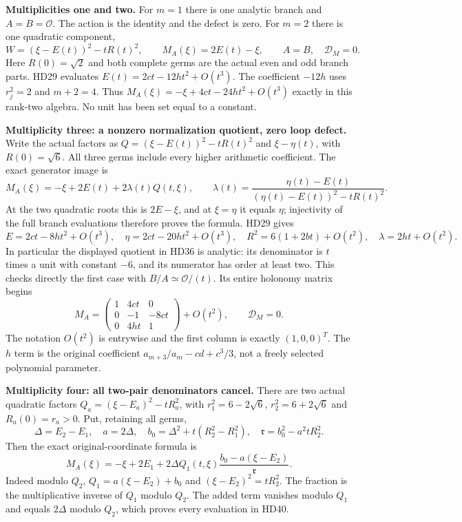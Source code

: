 \HD\textbf{Multiplicities one and two.}
For $m=1$ there is one analytic branch and $A=B=\mathcal O$.
The action is the identity and the defect is zero.
For $m=2$ there is one quadratic component,
\[
 W=(\xi-E(t))^2-tR(t)^2,\qquad
 M_A(\xi)=2E(t)-\xi,\qquad A=B,\quad\mathcal D_M=0 .
 \tag{HD35}
\]
Here $R(0)=\sqrt2$ and both complete germs are the actual
even and odd branch parts. HD29 evaluates
$E(t)=2ct-12ht^2+O(t^3)$.
The coefficient $-12h$ uses $r_j^2=2$ and $m+2=4$.
Thus $M_A(\xi)=-\xi+4ct-24ht^2+O(t^3)$ exactly in this rank-two
algebra. No unit has been set equal to a constant.

\HD\textbf{Multiplicity three: a nonzero normalization quotient, zero loop defect.}
Write the actual factors as
$Q=(\xi-E(t))^2-tR(t)^2$ and $\xi-\eta(t)$, with $R(0)=\sqrt6$.
All three germs include every higher arithmetic coefficient.
The exact generator image is
\[
 M_A(\xi)=-\xi+2E(t)+2\lambda(t)Q(t,\xi),\qquad
 \lambda(t)=\frac{\eta(t)-E(t)}
                {(\eta(t)-E(t))^2-tR(t)^2}.
 \tag{HD36}\label{hd:m3}
\]
At the two quadratic roots this is $2E-\xi$, and at $\xi=\eta$
it equals $\eta$; injectivity of the full branch evaluations
therefore proves the formula. HD29 gives
\[
 E=2ct-8ht^2+O(t^3),\quad
 \eta=2ct-20ht^2+O(t^3),\quad
 R^2=6(1+2bt)+O(t^2),\quad
 \lambda=2ht+O(t^2).
 \tag{HD37}
\]
In particular the displayed quotient in HD36 is analytic: its
denominator is $t$ times a unit with constant $-6$, and its
numerator has order at least two. This checks directly the first
case with $B/A\simeq\mathcal O/(t)$.
Its entire holonomy matrix begins
\[
 M_A=
 \begin{pmatrix}
  1&4ct&0\\
  0&-1&-8ct\\
  0&4ht&1
 \end{pmatrix}
       +O(t^2),\qquad \mathcal D_M=0 .
 \tag{HD38}
\]
The notation $O(t^2)$ is entrywise and the first column is exactly
$(1,0,0)^T$. The $h$ term is the original coefficient
$a_{m+3}/a_m-cd+c^3/3$, not a freely selected polynomial parameter.

\HD\textbf{Multiplicity four: all two-pair denominators cancel.}
There are two actual quadratic factors
$Q_a=(\xi-E_a)^2-tR_a^2$, with
$r_1^2=6-2\sqrt6$, $r_2^2=6+2\sqrt6$ and $R_a(0)=r_a>0$.
Put, retaining all germs,
\[
 \Delta=E_2-E_1,\quad a=2\Delta,\quad
 b_0=\Delta^2+t(R_2^2-R_1^2),\quad
 \mathfrak r=b_0^2-a^2tR_2^2 .
 \tag{HD39}
\]
Then the exact original-coordinate formula is
\[
 M_A(\xi)=-\xi+2E_1+
     2\Delta Q_1(t,\xi)
       \frac{b_0-a(\xi-E_2)}{\mathfrak r}.
 \tag{HD40}\label{hd:m4}
\]
Indeed modulo $Q_2$,
$Q_1=a(\xi-E_2)+b_0$ and $(\xi-E_2)^2=tR_2^2$.
The fraction is the multiplicative inverse of $Q_1$ modulo $Q_2$.
The added term vanishes modulo $Q_1$ and equals $2\Delta$
modulo $Q_2$, which proves every evaluation in HD40.

